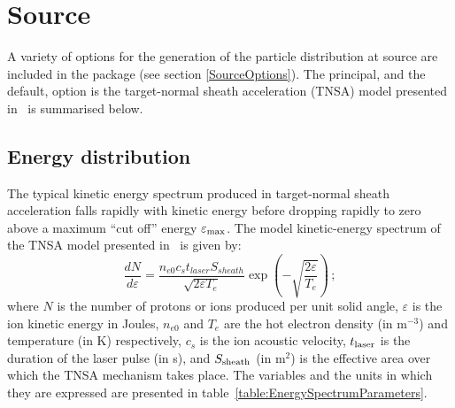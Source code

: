 \graphicspath{ {05-Source/Figures/} }

\section{Source}

A variety of options for the generation of the particle distribution
at source are included in the package (see section \ref{SourceOptions}).
The principal, and the default, option is the target-normal sheath
acceleration (TNSA) model presented in~\cite{10.1038/nphys199} is
summarised below.

\subsection{Energy distribution}

The typical kinetic energy spectrum produced in target-normal sheath
acceleration falls rapidly with kinetic energy before dropping rapidly
to zero above a maximum ``cut off'' energy $\varepsilon_{\rm max}$.
The model kinetic-energy spectrum of the TNSA model presented
in~\cite{10.1038/nphys199} is given by:
\begin{equation}
  \frac{dN}{d\varepsilon} = \frac{n_{e0} c_{s} t_{laser} S_{sheath}}
                                 {\sqrt{2\varepsilon T_{e}}}
                                 \exp\left(
                                     - \sqrt{\frac{2\varepsilon}{T_{e}}}
                                     \right)\,;
  \label{Eq:Spct:0}
\end{equation}
where $N$ is the number of protons or ions produced per unit solid
angle, $\varepsilon$ is the ion kinetic energy in Joules, $n_{e0}$ and
$T_e$ are the hot electron density (in m$^{-3}$) and temperature (in
K) respectively, $c_s$ is the ion acoustic velocity, $t_{\rm laser}$
is the duration of the laser pulse (in s), and $S_{\rm sheath}$ (in
m$^2$) is the effective area over which the TNSA mechanism takes
place.
The variables and the units in which they are expressed are presented
in table~\ref{table:EnergySpectrumParameters}.

